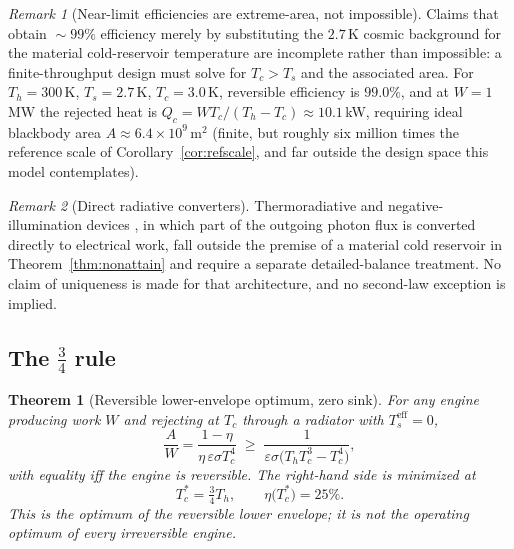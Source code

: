 \documentclass[11pt]{article}
\newtheorem{theorem}{Theorem}
\theoremstyle{definition}
\theoremstyle{remark}
\newtheorem{remark}{Remark}
\newcommand{\Th}{T_h}
\newcommand{\Tc}{T_c}
\newcommand{\Ts}{T_s^{\mathrm{eff}}}
\newcommand{\eps}{\varepsilon}
\begin{document}
\begin{remark}[Near-limit efficiencies are extreme-area, not impossible]\label{rem:99}
Claims that obtain ${\sim}99\%$ efficiency merely by substituting the $2.7\,$K cosmic background for the material cold-reservoir temperature are incomplete rather than impossible: a finite-throughput design must solve for $\Tc>T_{s}$ and the associated area. For $\Th=300\,$K, $T_{s}=2.7\,$K, $\Tc=3.0\,$K, reversible efficiency is $99.0\%$, and at $W=1\,$MW the rejected heat is $Q_{c}=W\Tc/(\Th-\Tc)\approx10.1\,$kW, requiring ideal blackbody area $A\approx6.4\times10^{9}\,\mathrm{m^{2}}$ (finite, but roughly six million times the reference scale of Corollary~\ref{cor:refscale}, and far outside the design space this model contemplates).
\end{remark}

\begin{remark}[Direct radiative converters]
Thermoradiative and negative-illumination devices \cite{strandberg2011,santhanam2016}, in which part of the outgoing photon flux is converted directly to electrical work, fall outside the premise of a material cold reservoir in Theorem~\ref{thm:nonattain} and require a separate detailed-balance treatment. No claim of uniqueness is made for that architecture, and no second-law exception is implied.
\end{remark}

\subsection{The \texorpdfstring{$\tfrac{3}{4}$}{3/4} rule}

\begin{theorem}[Reversible lower-envelope optimum, zero sink]\label{thm:34rule}
For any engine producing work $W$ and rejecting at $\Tc$ through a radiator with $\Ts=0$,
\begin{equation}
\frac{A}{W}=\frac{1-\eta}{\eta\,\eps\sigma \Tc^{4}}
\;\ge\;\frac{1}{\eps\sigma\bigl(\Th \Tc^{3}-\Tc^{4}\bigr)},
\label{eq:envelope}
\end{equation}
with equality iff the engine is reversible. The right-hand side is minimized at
\begin{equation}
\Tc^{*}=\tfrac{3}{4}\Th,
\qquad
\eta\bigl(\Tc^{*}\bigr)=25\%.
\end{equation}
This is the optimum of the reversible lower envelope; it is not the operating optimum of every irreversible engine.
\end{theorem}
\end{document}
